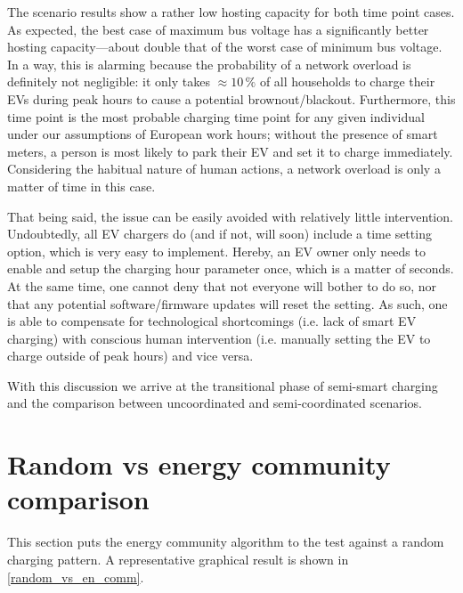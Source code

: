 \documentclass[a4paper,10pt]{report}
\begin{document}
The scenario results show a rather low hosting capacity for both time point cases. As expected, the best case of maximum bus voltage has a significantly better hosting capacity---about double that of the worst case of minimum bus voltage. In a way, this is alarming because the probability of a network overload is definitely not negligible: it only takes $\approx10\,\%$ of all households to charge their EVs during peak hours to cause a potential brownout/blackout. Furthermore, this time point is the most probable charging time point for any given individual under our assumptions of European work hours; without the presence of smart meters, a person is most likely to park their EV and set it to charge immediately. Considering the habitual nature of human actions, a network overload is only a matter of time in this case.

That being said, the issue can be easily avoided with relatively little intervention. Undoubtedly, all EV chargers do (and if not, will soon) include a time setting option, which is very easy to implement. Hereby, an EV owner only needs to enable and setup the charging hour parameter once, which is a matter of seconds. At the same time, one cannot deny that not everyone will bother to do so, nor that any potential software/firmware updates will reset the setting. As such, one is able to compensate for technological shortcomings (i.e. lack of smart EV charging) with conscious human intervention (i.e. manually setting the EV to charge outside of peak hours) and vice versa.

With this discussion we arrive at the transitional phase of semi-smart charging and the comparison between uncoordinated and semi-coordinated scenarios.


\section{Random vs energy community comparison}\label{section_rand_vs_comm}
This section puts the energy community algorithm to the test against a random charging pattern. A representative graphical result is shown in \cref{random_vs_en_comm}.
\end{document}
